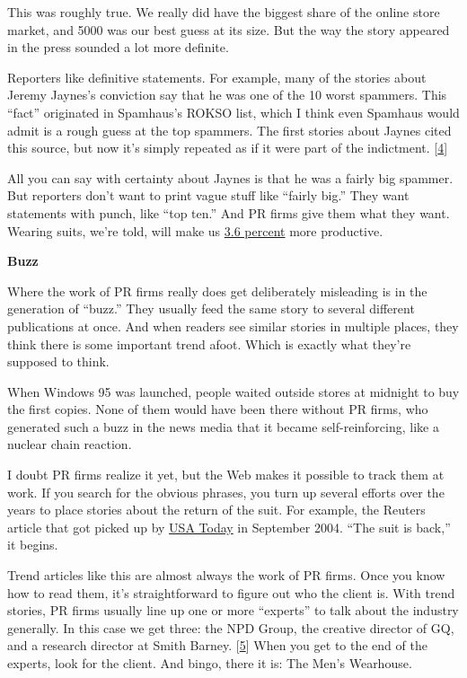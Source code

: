 This was roughly true. We really did have the biggest share of the
online store market, and 5000 was our best guess at its size. But the
way the story appeared in the press sounded a lot more definite.

Reporters like definitive statements. For example, many of the stories
about Jeremy Jaynes's conviction say that he was one of the 10 worst
spammers. This ``fact'' originated in Spamhaus's ROKSO list, which I
think even Spamhaus would admit is a rough guess at the top spammers.
The first stories about Jaynes cited this source, but now it's simply
repeated as if it were part of the indictment. {[}\hyperref[f4n]{4}{]}

All you can say with certainty about Jaynes is that he was a fairly big
spammer. But reporters don't want to print vague stuff like ``fairly
big.'' They want statements with punch, like ``top ten.'' And PR firms
give them what they want. Wearing suits, we're told, will make us
\href{http://sanfrancisco.bizjournals.com/sanfrancisco/stories/2002/02/25/story5.html?t=printable}{3.6
percent} more productive.

\textbf{Buzz}

Where the work of PR firms really does get deliberately misleading is in
the generation of ``buzz.'' They usually feed the same story to several
different publications at once. And when readers see similar stories in
multiple places, they think there is some important trend afoot. Which
is exactly what they're supposed to think.

When Windows 95 was launched, people waited outside stores at midnight
to buy the first copies. None of them would have been there without PR
firms, who generated such a buzz in the news media that it became
self-reinforcing, like a nuclear chain reaction.

I doubt PR firms realize it yet, but the Web makes it possible to track
them at work. If you search for the obvious phrases, you turn up several
efforts over the years to place stories about the return of the suit.
For example, the Reuters article that got picked up by
\href{http://www.usatoday.com/money/industries/retail/2004-09-01-suits_x.htm}{USA
Today} in September 2004. ``The suit is back,'' it begins.

Trend articles like this are almost always the work of PR firms. Once
you know how to read them, it's straightforward to figure out who the
client is. With trend stories, PR firms usually line up one or more
``experts'' to talk about the industry generally. In this case we get
three: the NPD Group, the creative director of GQ, and a research
director at Smith Barney. {[}\hyperref[f5n]{5}{]} When you get to the
end of the experts, look for the client. And bingo, there it is: The
Men's Wearhouse.

